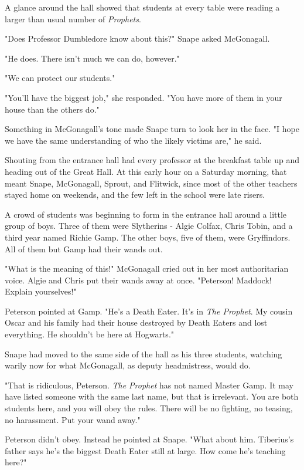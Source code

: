 A glance around the hall showed that students at every table were reading a larger than usual number of \emph{Prophets}.

"Does Professor Dumbledore know about this?" Snape asked McGonagall.

"He does. There isn't much we can do, however."

"We can protect our students."

"You'll have the biggest job," she responded. "You have more of them in your house than the others do."

Something in McGonagall's tone made Snape turn to look her in the face. "I hope we have the same understanding of who the likely victims are," he said.

Shouting from the entrance hall had every professor at the breakfast table up and heading out of the Great Hall. At this early hour on a Saturday morning, that meant Snape, McGonagall, Sprout, and Flitwick, since most of the other teachers stayed home on weekends, and the few left in the school were late risers.

A crowd of students was beginning to form in the entrance hall around a little group of boys. Three of them were Slytherins - Algie Colfax, Chris Tobin, and a third year named Richie Gamp. The other boys, five of them, were Gryffindors. All of them but Gamp had their wands out.

"What is the meaning of this!" McGonagall cried out in her most authoritarian voice. Algie and Chris put their wands away at once. "Peterson! Maddock! Explain yourselves!"

Peterson pointed at Gamp. "He's a Death Eater. It's in \emph{The Prophet}. My cousin Oscar and his family had their house destroyed by Death Eaters and lost everything. He shouldn't be here at Hogwarts."

Snape had moved to the same side of the hall as his three students, watching warily now for what McGonagall, as deputy headmistress, would do.

"That is ridiculous, Peterson. \emph{The Prophet} has not named Master Gamp. It may have listed someone with the same last name, but that is irrelevant. You are both students here, and you will obey the rules. There will be no fighting, no teasing, no harassment. Put your wand away."

Peterson didn't obey. Instead he pointed at Snape. "What about him. Tiberius's father says he's the biggest Death Eater still at large. How come he's teaching here?"

